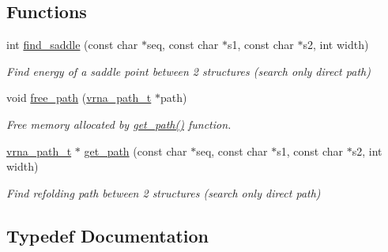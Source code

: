 \subsection*{Functions}
\begin{DoxyCompactItemize}
\item 
int \mbox{\hyperlink{group__paths__deprecated_ga4c0dabf032c04eeab9c7370d15db6ad2}{find\+\_\+saddle}} (const char $\ast$seq, const char $\ast$s1, const char $\ast$s2, int width)
\begin{DoxyCompactList}\small\item\em Find energy of a saddle point between 2 structures (search only direct path) \end{DoxyCompactList}\item 
void \mbox{\hyperlink{group__paths__deprecated_ga9056421d716ae89f0ed3f107627f395b}{free\+\_\+path}} (\mbox{\hyperlink{group__paths_ga818d4f3d1cf8723d6905990b08d909fe}{vrna\+\_\+path\+\_\+t}} $\ast$path)
\begin{DoxyCompactList}\small\item\em Free memory allocated by \mbox{\hyperlink{group__paths__deprecated_gac009a44db824f90a6de5f9c28b9b3222}{get\+\_\+path()}} function. \end{DoxyCompactList}\item 
\mbox{\hyperlink{group__paths_ga818d4f3d1cf8723d6905990b08d909fe}{vrna\+\_\+path\+\_\+t}} $\ast$ \mbox{\hyperlink{group__paths__deprecated_gac009a44db824f90a6de5f9c28b9b3222}{get\+\_\+path}} (const char $\ast$seq, const char $\ast$s1, const char $\ast$s2, int width)
\begin{DoxyCompactList}\small\item\em Find refolding path between 2 structures (search only direct path) \end{DoxyCompactList}\end{DoxyCompactItemize}


\subsection{Typedef Documentation}
\mbox{\label{group__paths__deprecated_gab6b8737d5377e70a7815d04aae7fd884}} 
